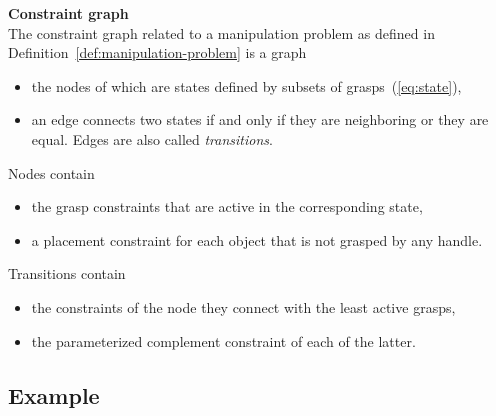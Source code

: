 \begin{definition}\label{def:constraint-graph}\textbf{Constraint graph}\\
  The constraint graph related to a manipulation problem as defined in Definition~\ref{def:manipulation-problem} is a graph
  \begin{itemize}
  \item the nodes of which are states defined by subsets of grasps~(\ref{eq:state}),
  \item an edge connects two states if and only if they are neighboring or they are equal. Edges are also called \textit{transitions}.
  \end{itemize}
  Nodes contain
  \begin{itemize}
  \item the grasp constraints that are active in the corresponding state,
  \item a placement constraint for each object that is not grasped by any handle.
  \end{itemize}
  Transitions contain
  \begin{itemize}
  \item the constraints of the node they connect with the least active grasps,
  \item the parameterized complement constraint of each of the latter.
  \end{itemize}
\end{definition}

\subsection{Example}\label{subsec:ur3-cylinder}


